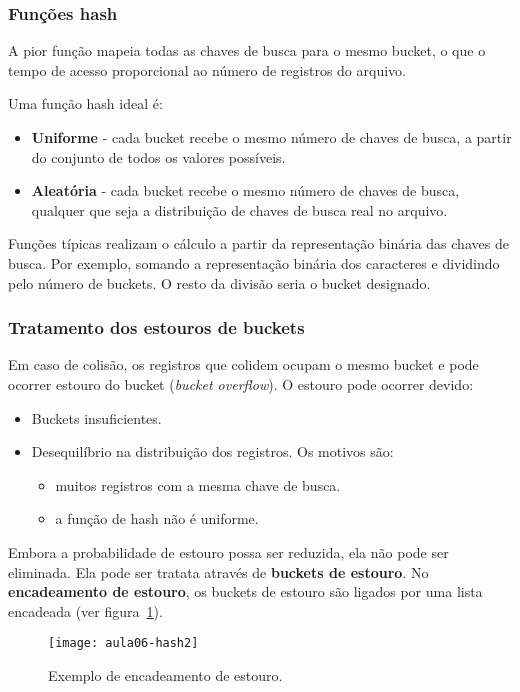 \subsubsection{Funções hash}

A pior função mapeia todas as chaves de busca para o mesmo bucket, o que 
o tempo de acesso proporcional ao número de registros do arquivo.

Uma função hash ideal é:
\begin{itemize}
\item \textbf{Uniforme} - cada bucket recebe o mesmo número de chaves
de busca, a partir do conjunto de todos os valores possíveis.
\item \textbf{Aleatória} - cada bucket recebe o mesmo número de 
chaves de busca, qualquer que seja a distribuição de chaves de busca real no
arquivo.
\end{itemize}

Funções típicas realizam o cálculo a partir da representação binária das chaves
de busca. 
Por exemplo, somando a representação binária dos caracteres e dividindo pelo número
de buckets.
O resto da divisão seria o bucket designado.

\subsubsection{Tratamento dos estouros de buckets}

Em caso de colisão, os registros que colidem ocupam o mesmo bucket e pode
ocorrer estouro do bucket (\emph{bucket overflow}).
O estouro pode ocorrer devido:
\begin{itemize}
\item Buckets insuficientes.
\item Desequilíbrio na distribuição dos registros.
Os motivos são:
	\begin{itemize}
	\item muitos registros com a mesma chave de busca.
	\item a função de hash não é uniforme.
	\end{itemize}
\end{itemize}

Embora a probabilidade de estouro possa ser reduzida, ela não pode
ser eliminada.
Ela pode ser tratata através de \textbf{buckets de estouro}.
No \textbf{encadeamento de estouro}, os buckets de estouro são ligados
por uma lista encadeada (ver figura~\ref{aula06:fig:hash2}).
%
\begin{figure}[!htb]
\centering
\texttt{[image: aula06-hash2]}
\caption{Exemplo de encadeamento de estouro.}
\label{aula06:fig:hash2}
\end{figure}

